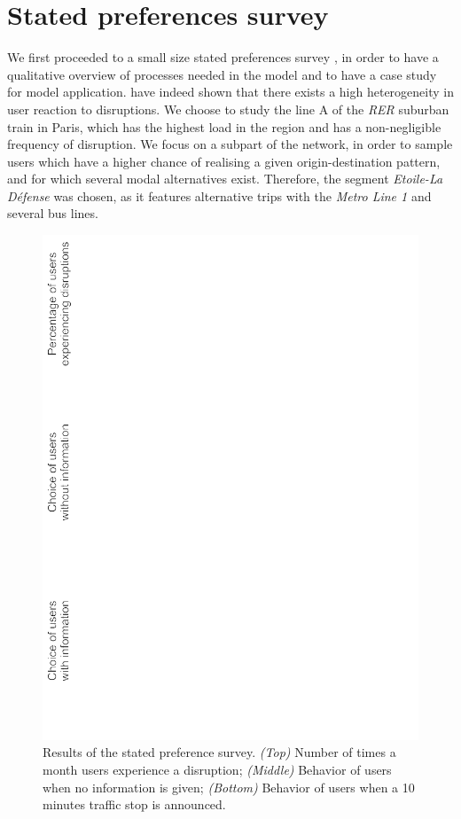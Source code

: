 \documentclass[10pt]{article}
\begin{document}
\section{Stated preferences survey}


We first proceeded to a small size stated preferences survey \citep{kroes1988stated}, in order to have a qualitative overview of processes needed in the model and to have a case study for model application. \cite{martin2016strategies} have indeed shown that there exists a high heterogeneity in user reaction to disruptions. We choose to study the line A of the \emph{RER} suburban train in Paris, which has the highest load in the region and has a non-negligible frequency of disruption. We focus on a subpart of the network, in order to sample users which have a higher chance of realising a given origin-destination pattern, and for which several modal alternatives exist. Therefore, the segment \emph{Etoile-La D{\'e}fense} was chosen, as it features alternative trips with the \emph{Metro Line 1} and several bus lines.


\begin{figure}%
\centerline{\includegraphics[width=\linewidth]{Fig1.png}}
\caption{Results of the stated preference survey. \textit{(Top)} Number of times a month users experience a disruption; \textit{(Middle)} Behavior of users when no information is given; \textit{(Bottom)} Behavior of users when a 10 minutes traffic stop is announced.\label{fig:fig1}}
\end{figure}
\end{document}
